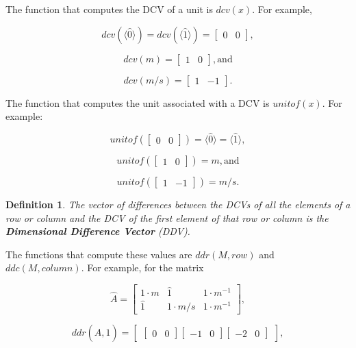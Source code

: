 \documentclass[10pt,letterpaper]{article}
\newtheorem{defn}{Definition}[section]
\numberwithin{equation}{section}
\begin{document}
The function that computes the DCV of a unit is $dcv(x)$.  For example,

\[ dcv(\langle\hat 0 \rangle) = dcv(\langle\hat 1 \rangle) = \left[ \begin{matrix} 0 & 0 \end{matrix} \right] , \]

\[ dcv(m) = \left[ \begin{matrix} 1 & 0 \end{matrix} \right] , \mbox{and} \]

\[ dcv(m/s) = \left[ \begin{matrix} 1 & -1 \end{matrix} \right] . \]

The function that computes the unit associated with a DCV is $unitof(x)$.  For example:

\[  unitof(\left[ \begin{matrix} 0 & 0 \end{matrix} \right]) = \langle\hat 0 \rangle = \langle\hat 1 \rangle , \]

\[ unitof(\left[ \begin{matrix} 1 & 0 \end{matrix} \right]) = m, \mbox{and} \]

\[ unitof(\left[ \begin{matrix} 1 & -1 \end{matrix} \right]) = m/s. \]

\begin{defn}The vector of differences between the DCVs of all the elements of a row or column and the DCV of the first element of that row or column is the \textbf{Dimensional Difference Vector} (DDV).\end{defn}

The functions that compute these values are $ddr(M, row)$ and $ddc(M, column)$.  For example, for the matrix

\[ \hat A = \left[ \begin{matrix} 
  1 \cdot m & \hat 1 & 1 \cdot m^{-1} \\
  \hat 1 & 1 \cdot m/s & 1 \cdot m^{-1}
 \end{matrix} \right] , \]

\[ ddr(\hat A, 1) = \left[ \begin{matrix} \left[ \begin{matrix} 0 & 0 \end{matrix} \right] \left[ \begin{matrix} -1 & 0 \end{matrix} \right] \left[ \begin{matrix} -2 & 0 \end{matrix} \right] \end{matrix} \right] , \]
\end{document}
